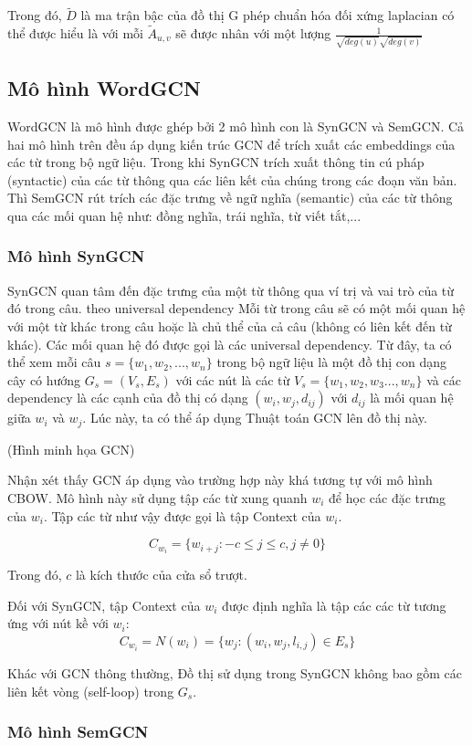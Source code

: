 Trong đó, $\tilde{D}$ là ma trận bậc của đồ thị G phép chuẩn hóa đối xứng laplacian có thể được hiểu là với mỗi $\tilde{A}_{u,v}$ sẽ được nhân với một lượng $\frac{1}{\sqrt{deg(u)}\sqrt{deg(v)}}$

\subsection{Mô hình WordGCN}

WordGCN là mô hình được ghép bởi 2 mô hình con là SynGCN và SemGCN. Cả hai mô hình trên đều áp dụng kiến trúc GCN để trích xuất các embeddings của các từ trong bộ ngữ liệu. Trong khi SynGCN trích xuất thông tin cú pháp (syntactic) của các từ thông qua các liên kết của chúng trong các đoạn văn bản. Thì SemGCN rút trích các đặc trưng về ngữ nghĩa (semantic) của các từ thông qua các mối quan hệ như: đồng nghĩa, trái nghĩa, từ viết tắt,...

\subsubsection{Mô hình SynGCN}

SynGCN quan tâm đến đặc trưng của một từ thông qua ví trị và vai trò của từ đó trong câu. theo universal dependency Mỗi từ trong câu sẽ có một mối quan hệ với một từ khác trong câu hoặc là chủ thể của cả câu (không có liên kết đến từ khác). Các mối quan hệ đó được gọi là các universal dependency. Từ đây, ta có thể xem mỗi câu $s = \{w_1, w_2,...,w_n\}$ trong bộ ngữ liệu là một đồ thị con dạng cây có hướng $G_s = (V_s, E_s)$ với các nút là các từ $V_s=\{w_1, w_2, w_3...,w_n\}$ và các dependency là các cạnh của đồ thị có dạng $(w_i, w_j, d_{ij})$ với $d_{ij}$ là mối quan hệ giữa $w_i$ và $w_j$. Lúc này, ta có thể áp dụng Thuật toán GCN lên đồ thị này. 

(Hình minh họa GCN)

Nhận xét thấy GCN áp dụng vào trường hợp này khá tương tự với mô hình CBOW. Mô hình này sử dụng tập các từ xung quanh $w_i$ để học các đặc trưng của $w_i$. Tập các từ như vậy được gọi là tập Context của $w_i$.

\begin{equation*}
	C_{w_i} = \{w_{i+j}: -c \leq j \leq c, j \neq 0\}
\end{equation*}

Trong đó, $c$ là kích thước của cửa sổ trượt.

Đối với SynGCN, tập Context của $w_i$ được định nghĩa là tập các các từ tương ứng với nút kề với $w_i$:
\begin{equation*}
	C_{w_i} = N(w_i) = \{w_j: (w_i, w_j, l_{i,j}) \in E_s\}
\end{equation*}

Khác với GCN thông thường, Đồ thị sử dụng trong SynGCN không bao gồm các liên kết vòng (self-loop) trong $G_s$.

\subsubsection{Mô hình SemGCN}